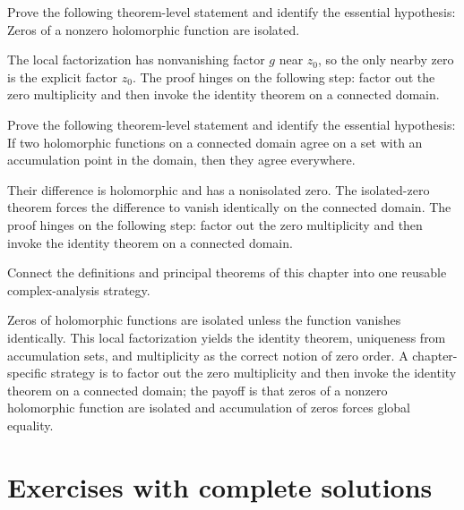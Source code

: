 \begin{problem}\label{prob:iv07-problem-10}
Prove the following theorem-level statement and identify the essential hypothesis: Zeros of a nonzero holomorphic function are isolated.
\end{problem}
\begin{solution}
The local factorization has nonvanishing factor $g$ near $z_0$, so the only nearby zero is the explicit factor $z_0$. The proof hinges on the following step: factor out the zero multiplicity and then invoke the identity theorem on a connected domain.
\end{solution}

\begin{problem}\label{prob:iv07-problem-11}
Prove the following theorem-level statement and identify the essential hypothesis: If two holomorphic functions on a connected domain agree on a set with an accumulation point in the domain, then they agree everywhere.
\end{problem}
\begin{solution}
Their difference is holomorphic and has a nonisolated zero. The isolated-zero theorem forces the difference to vanish identically on the connected domain. The proof hinges on the following step: factor out the zero multiplicity and then invoke the identity theorem on a connected domain.
\end{solution}

\begin{problem}\label{prob:iv07-problem-12}
Connect the definitions and principal theorems of this chapter into one reusable complex-analysis strategy.
\end{problem}
\begin{solution}
Zeros of holomorphic functions are isolated unless the function vanishes identically. This local factorization yields the identity theorem, uniqueness from accumulation sets, and multiplicity as the correct notion of zero order. A chapter-specific strategy is to factor out the zero multiplicity and then invoke the identity theorem on a connected domain; the payoff is that zeros of a nonzero holomorphic function are isolated and accumulation of zeros forces global equality.
\end{solution}

\section{Exercises with complete solutions}

